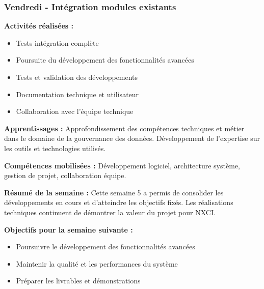 \subsubsection{Vendredi - Intégration modules existants}

\textbf{Activités réalisées :}
\begin{itemize}
    \item Tests intégration complète
    \item Poursuite du développement des fonctionnalités avancées
    \item Tests et validation des développements
    \item Documentation technique et utilisateur
    \item Collaboration avec l'équipe technique
\end{itemize}

\textbf{Apprentissages :}
Approfondissement des compétences techniques et métier dans le domaine de la gouvernance des données. Développement de l'expertise sur les outils et technologies utilisés.

\textbf{Compétences mobilisées :}
Développement logiciel, architecture système, gestion de projet, collaboration équipe.

\textbf{Résumé de la semaine :}
Cette semaine 5 a permis de consolider les développements en cours et d'atteindre les objectifs fixés. Les réalisations techniques continuent de démontrer la valeur du projet pour NXCI.

\textbf{Objectifs pour la semaine suivante :}
\begin{itemize}
    \item Poursuivre le développement des fonctionnalités avancées
    \item Maintenir la qualité et les performances du système
    \item Préparer les livrables et démonstrations
\end{itemize}

